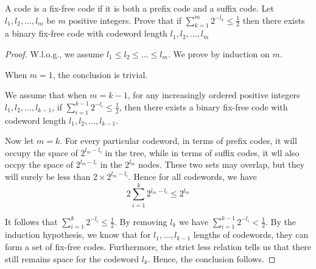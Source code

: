 \begin{exercise}{ A code is a fix-free code if it is both a prefix code and a suffix code. Let $l_{1}, l_{2}, \ldots, l_{m}$ be $m$ positive integers. Prove that if
  $\sum_{k=1}^{m} 2^{-l_{k}} \leq \frac{1}{2}$
  then there exists a binary fix-free code with codeword length $l_{1}, l_{2}, \ldots, l_{m}$}
  \begin{proof}
  W.l.o.g., we assume $l_1\le l_2 \le \ldots \le l_m$. We prove by induction on $m$.
  
  When $m=1$, the conclusion is trivial.

  We assume that when $m=k-1$, for any increasingly ordered positive integers $l_1,l_2,\ldots,l_{k-1}$, if $\sum_{i=1}^{k-1} 2^{-l_i} \le \frac{1}{2}$, then there exists a binary fix-free code with codeword length $l_1,l_2,\ldots,l_{k-1}$.

  Now let $m=k$. For every particular codeword, in terms of prefix codes, it will occupy the space of $2^{l_m - l_i}$ in the tree, while in terms of suffix codes, it wll also occpy the space of $2^{l_m - l_i}$ in the $2^{l_m}$ nodes. These two sets may overlap, but they will surely be less than $2\times 2^{l_m - l_i}$. Hence for all codewords, we have
  \begin{equation}
    2 \sum_{i=1}^{k} 2^{l_m - l_i} \le 2^{l_m} 
  \end{equation}
  
  
  It follows that $\sum_{i=1}^{k} 2^{-l_i} \le \frac{1}{2}$. By removing $l_k$ we have $\sum_{i=1}^{k-1} 2^{-l_i} < \frac{1}{2}$. By the induction hypothesis, we know that for $l_1,\ldots,l_{k-1}$ lengths of codewords, they can form a set of fix-free codes. Furthermore, the strict less relation tells us that there still remains space for the codeword $l_k$. Hence, the conclusion follows.
  \end{proof}
  \label{ex5-2}
\end{exercise}

